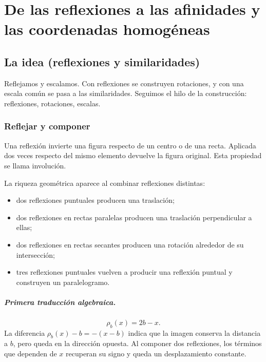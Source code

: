\chapter{De las reflexiones a las afinidades y las coordenadas homogéneas}\label{cap:afines}\label{sec:bloque-euclideas}


\section{La idea (reflexiones y similaridades)}

Reflejamos y escalamos. Con reflexiones se construyen rotaciones, y con una escala común se pasa a las similaridades. Seguimos el hilo de la construcción: reflexiones, rotaciones, escalas.

\subsection{Reflejar y componer}\label{sec:reflejar}

{\small\vspace{1mm}\par}


Una reflexión invierte una figura respecto de un centro o de una recta. Aplicada dos veces
respecto del mismo elemento devuelve la figura original. Esta propiedad se llama involución.

La riqueza geométrica aparece al combinar reflexiones distintas:
\begin{itemize}
  \item dos reflexiones puntuales producen una traslación;
  \item dos reflexiones en rectas paralelas producen una traslación perpendicular a ellas;
  \item dos reflexiones en rectas secantes producen una rotación alrededor de su intersección;
  \item tres reflexiones puntuales vuelven a producir una reflexión puntual y construyen un
  paralelogramo.
\end{itemize}

\paragraph{Primera traducción algebraica.}
\[
  \rho_b(x)=2b-x.
\]
La diferencia \(\rho_b(x)-b=-(x-b)\) indica que la imagen conserva la distancia a \(b\),
pero queda en la dirección opuesta. Al componer dos reflexiones, los términos que dependen de
\(x\) recuperan su signo y queda un desplazamiento constante.

